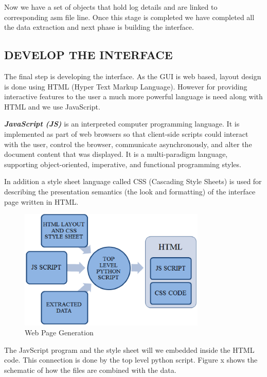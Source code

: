 \vspace{1.5cm}
Now we have a set of objects that hold log details and are linked to corresponding asm file line. Once this stage is completed we have completed all the data extraction and next phase is building the interface.

\subsection {DEVELOP THE INTERFACE}

The final step is developing the interface. As the GUI is web based, layout design is done using HTML (Hyper Text Markup Language). However for providing interactive features to the user a much more powerful language is need along with HTML and we use JavaScript.

\emph {\bf JavaScript (JS)} is an interpreted computer programming language. It is  implemented as part of web browsers so that client-side scripts could interact with the user, control the browser, communicate asynchronously, and alter the document content that was displayed. It is a multi-paradigm language, supporting object-oriented, imperative, and functional programming styles.

In addition a style sheet language called CSS (Cascading Style Sheets) is used for describing the presentation semantics (the look and formatting) of the interface page written in HTML.
\begin{figure}[H]
\centering
\includegraphics[width=3.5in]{./figures/html.eps}
\caption{Web Page Generation}
\end{figure}


The JavScript program and the style sheet will we embedded inside the HTML code. This connection is done by the top level python script. Figure x shows the schematic of how the files are combined with the data.



